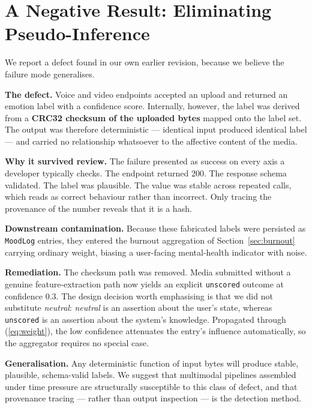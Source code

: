 \documentclass[runningheads]{llncs}
\begin{document}
\section{A Negative Result: Eliminating Pseudo-Inference}
\label{sec:negative}

We report a defect found in our own earlier revision, because we believe the
failure mode generalises.

\textbf{The defect.} Voice and video endpoints accepted an upload and returned
an emotion label with a confidence score. Internally, however, the label was
derived from a \textbf{CRC32 checksum of the uploaded bytes} mapped onto the
label set. The output was therefore deterministic --- identical input produced
identical label --- and carried no relationship whatsoever to the affective
content of the media.

\textbf{Why it survived review.} The failure presented as success on every
axis a developer typically checks. The endpoint returned 200. The response
schema validated. The label was plausible. The value was stable across
repeated calls, which reads as correct behaviour rather than incorrect. Only
tracing the provenance of the number reveals that it is a hash.

\textbf{Downstream contamination.} Because these fabricated labels were
persisted as \texttt{MoodLog} entries, they entered the burnout aggregation of
Section~\ref{sec:burnout} carrying ordinary weight, biasing a user-facing
mental-health indicator with noise.

\textbf{Remediation.} The checksum path was removed. Media submitted without a
genuine feature-extraction path now yields an explicit \texttt{unscored}
outcome at confidence $0.3$. The design decision worth emphasising is that we
did not substitute \textit{neutral}: \textit{neutral} is an assertion about the
user's state, whereas \texttt{unscored} is an assertion about the system's
knowledge. Propagated through (\ref{eq:weight}), the low confidence attenuates
the entry's influence automatically, so the aggregator requires no special
case.

\textbf{Generalisation.} Any deterministic function of input bytes will
produce stable, plausible, schema-valid labels. We suggest that multimodal
pipelines assembled under time pressure are structurally susceptible to this
class of defect, and that provenance tracing --- rather than output
inspection --- is the detection method.
\end{document}

